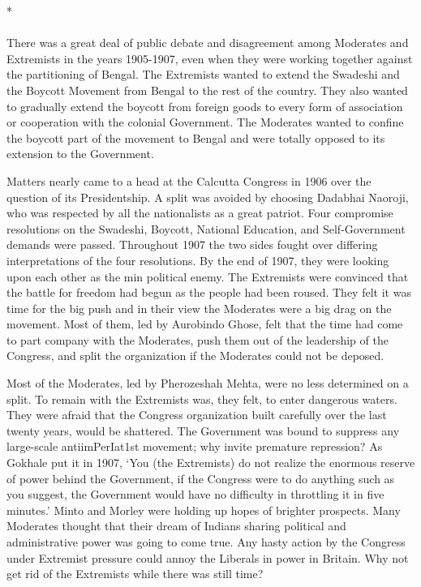 \begin{center}*\end{center}

\paragraph*{}


There was a great deal of public debate and disagreement among Moderates and Extremists in the years 1905-1907, even when they were working together against the partitioning of Bengal. The Extremists wanted to extend the Swadeshi and the Boycott Movement from Bengal to the rest of the country. They also wanted to gradually extend the boycott from foreign goods to every form of association or cooperation with the colonial Government. The Moderates wanted to confine the boycott part of the movement to Bengal and were totally opposed to its extension to the Government.

Matters nearly came to a head at the Calcutta Congress in 1906 over the question of its Presidentship. A split was avoided by choosing Dadabhai Naoroji, who was respected by all the nationalists as a great patriot. Four compromise resolutions on the Swadeshi, Boycott, National Education, and Self-Government demands were passed. Throughout 1907 the two sides fought over differing interpretations of the four resolutions. By the end of 1907, they were looking upon each other as the min political enemy. The Extremists were convinced that the battle for freedom had begun as the people had been roused. They felt it was time for the big push and in their view the Moderates were a big drag on the movement. Most of them, led by Aurobindo Ghose, felt that the time had come to part company with the Moderates, push them out of the leadership of the Congress, and split the organization if the Moderates could not be deposed.

Most of the Moderates, led by Pherozeshah Mehta, were no less determined on a split. To remain with the Extremists was, they felt, to enter dangerous waters. They were afraid that the Congress organization built carefully over the last twenty years, would be shattered. The Government was bound to suppress any large-scale antiimPerIat1st movement; why invite premature repression? As Gokhale put it in 1907, `You (the Extremists) do not realize the enormous reserve of power behind the Government, if the Congress were to do anything such as you suggest, the Government would have no difficulty in throttling it in five minutes.' Minto and Morley were holding up hopes of brighter prospects. Many Moderates thought that their dream of Indians sharing political and administrative power was going to come true. Any hasty action by the Congress under Extremist pressure could annoy the Liberals in power in Britain. Why not get rid of the Extremists while there was still time?


